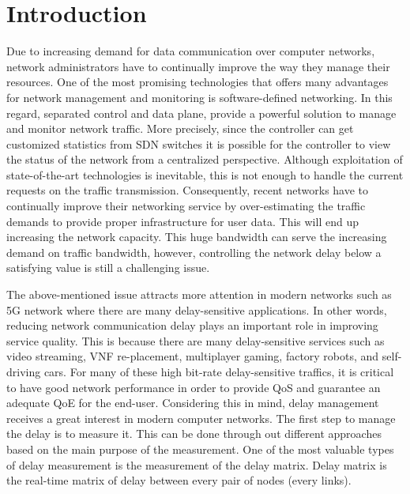 \documentclass[10pt, journal, letterpaper]{IEEEtran}
\begin{document}
\section{Introduction}
Due to increasing demand for data communication over computer networks, network administrators have to continually improve the way they manage their resources. One of the most promising technologies that offers many advantages for network management and monitoring is software-defined networking. In this regard, separated control and data plane, provide a powerful solution to manage and monitor network traffic. More precisely, since the controller can get customized statistics from SDN switches it is possible for the controller to view the status of the network from a centralized perspective. Although exploitation of state-of-the-art technologies is inevitable, this is not enough to handle the current requests on the traffic transmission. Consequently, recent networks have to continually improve their networking service by over-estimating the traffic demands to provide proper infrastructure for user data. This will end up increasing the network capacity. This huge bandwidth can serve the increasing demand on traffic bandwidth, however, controlling the network delay below a satisfying value is still a challenging issue. 

The above-mentioned issue attracts more attention in modern networks such as 5G network where there are many delay-sensitive applications. In other words, reducing network communication delay plays an important role in improving service quality. This is because there are many delay-sensitive services such as video streaming, VNF re-placement, multiplayer gaming, factory robots, and self-driving cars. For many of these high bit-rate delay-sensitive traffics, it is critical to have good network performance in order to provide QoS and guarantee an adequate QoE for the end-user. Considering this in mind, delay management receives a great interest in modern computer networks. The first step to manage the delay is to measure it. This can be done through out different approaches based on the main purpose of the measurement. One of the most valuable types of delay measurement is the measurement of the delay matrix. Delay matrix is the real-time matrix of delay between every pair of nodes (every links). 
\end{document}
